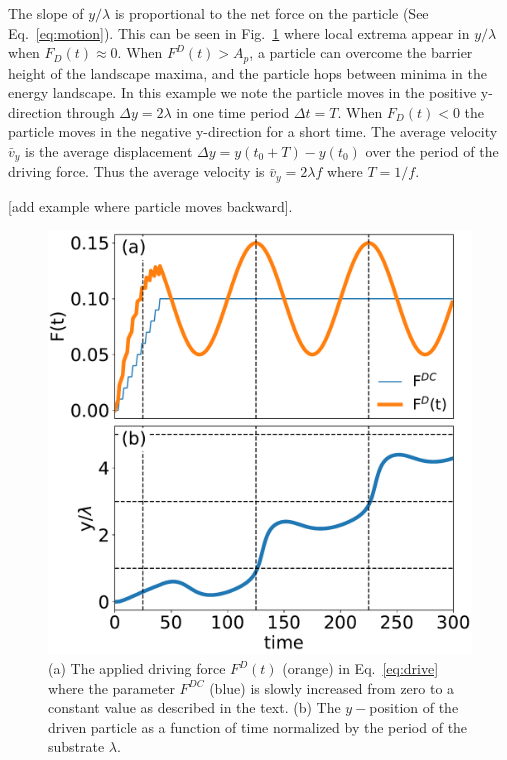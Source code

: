 \documentclass[twocolumn,preprintnumbers,amsmath,amssymb,aps,prx]{revtex4}
\begin{document}
The slope of $y/\lambda$
is proportional to the net force on the particle (See Eq.~\ref{eq:motion}).
This can be seen in 
Fig.~\ref{fig:0} %
where local extrema appear in $y/\lambda$
when $F_{D}(t) \approx 0 $. 
When $F^D(t) > A_p$, a particle can 
overcome the barrier height of the landscape maxima,
and 
the particle hops between minima in the energy landscape.
In this example
we note 
the particle moves
in the positive y-direction
through $\Delta y = 2 \lambda$ in one time period $\Delta t = T$.
When $F_{D}(t) < 0 $
the particle moves in the negative y-direction 
for a short time.
The average velocity $\bar{v}_y$
is the average displacement $\Delta y = y(t_0+T) - y(t_0)$
over the period of the driving force.
Thus the average velocity 
is $\bar{v}_y = 2 \lambda f$ where $T = 1/f$.

[add example where particle moves backward].


\begin{center}
\begin{figure}[h!]
\centering
\includegraphics[width=\columnwidth]{single_particle.pdf}
\caption{(a) The applied driving force $F^D(t)$ (orange) in Eq.~\ref{eq:drive}
  where the parameter $F^{DC}$ (blue) is slowly increased from zero to a constant value
  as described in the text.  (b) 
  The $y-$position of the driven particle as a function of time %
  normalized by the period of the substrate $\lambda$.
  }
\label{fig:0}
\end{figure}
\end{center}
\end{document}
